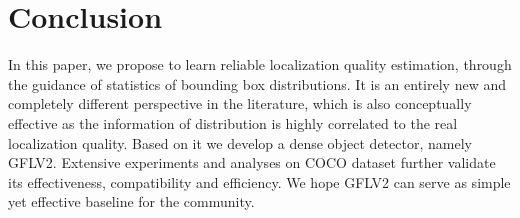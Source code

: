 \documentclass[10pt,twocolumn,letterpaper]{article}
\begin{document}
\section{Conclusion}
In this paper, we propose to learn reliable localization quality estimation, through the guidance of statistics of bounding box distributions. It is an entirely new and completely different perspective in the literature, which is also conceptually effective as the information of distribution is highly correlated to the real localization quality. Based on it we develop a dense object detector, namely GFLV2. Extensive experiments and analyses on COCO dataset further validate its effectiveness, compatibility and efficiency. We hope GFLV2 can serve as simple yet effective baseline for the community.










{\small


}
\end{document}
